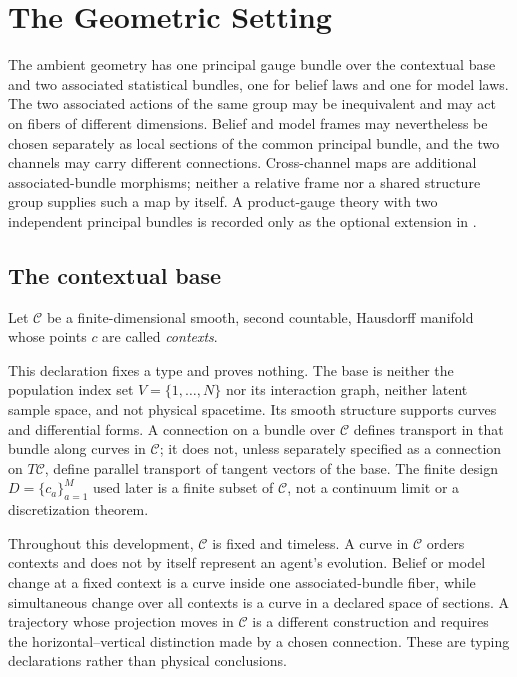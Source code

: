 \chapter{The Geometric Setting}
\label{ch:geometry}

The ambient geometry has one principal gauge bundle over the contextual base and two associated
statistical bundles, one for belief laws and one for model laws.  The two associated actions of
the same group may be inequivalent and may act on fibers of different dimensions.  Belief and
model frames may nevertheless be chosen separately as local sections of the common principal
bundle, and the two channels may carry different connections.  Cross-channel maps are additional
associated-bundle morphisms; neither a relative frame nor a shared structure group supplies such a
map by itself.  A product-gauge theory with two independent principal bundles is recorded only as
the optional extension in .

\section{The contextual base}
\label{sec:geo-base}

Let $\mathcal C$ be a finite-dimensional smooth, second countable, Hausdorff manifold whose points
$c$ are called \emph{contexts}. 

This declaration fixes a type and proves nothing.  The base is neither the population index set
$V=\{1,\dots,N\}$ nor its interaction graph, neither latent sample space, and not physical
spacetime.  Its smooth structure supports curves and differential forms.  A connection on a
bundle over $\mathcal C$ defines transport in that bundle along curves in $\mathcal C$; it does
not, unless separately specified as a connection on $T\mathcal C$, define parallel transport of
tangent vectors of the base.  The finite design $D=\{c_a\}_{a=1}^{M}$ used later is a finite
subset of $\mathcal C$, not a continuum limit or a discretization theorem.

Throughout this development, $\mathcal C$ is fixed and timeless.  A curve in $\mathcal C$
orders contexts and does not by itself represent an agent's evolution.  Belief or model change
at a fixed context is a curve inside one associated-bundle fiber, while simultaneous change over
all contexts is a curve in a declared space of sections.  A trajectory whose projection moves in
$\mathcal C$ is a different construction and requires the horizontal--vertical distinction made
by a chosen connection.  These are typing declarations rather than physical conclusions.

